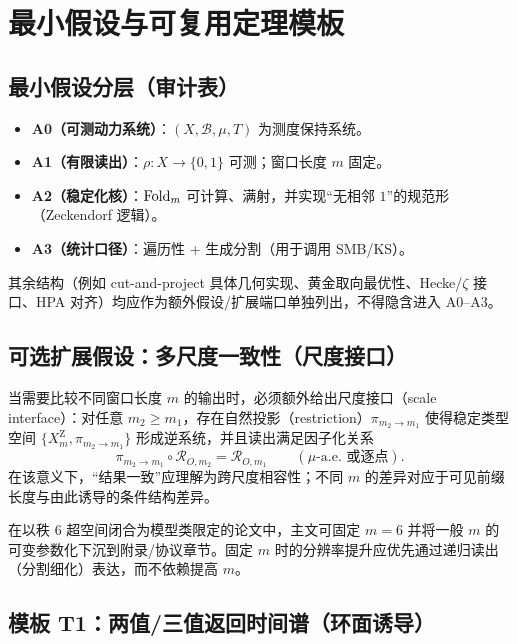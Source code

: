 \section{最小假设与可复用定理模板}

\subsection{最小假设分层（审计表）}

\begin{itemize}
  \item \textbf{A0（可测动力系统）}：$(X,\mathcal{B},\mu,T)$ 为测度保持系统。
  \item \textbf{A1（有限读出）}：$\rho:X\to\{0,1\}$ 可测；窗口长度 $m$ 固定。
  \item \textbf{A2（稳定化核）}：$\mathrm{Fold}_m$ 可计算、满射，并实现“无相邻 $1$”的规范形（Zeckendorf 逻辑）。
  \item \textbf{A3（统计口径）}：遍历性 + 生成分割（用于调用 SMB/KS）。
\end{itemize}

其余结构（例如 cut-and-project 具体几何实现、黄金取向最优性、Hecke/\(\zeta\) 接口、HPA 对齐）均应作为额外假设/扩展端口单独列出，不得隐含进入 A0--A3。

\subsection{可选扩展假设：多尺度一致性（尺度接口）}

\begin{assumption}\label{assump:A4-scale}
当需要比较不同窗口长度 $m$ 的输出时，必须额外给出尺度接口（scale interface）：对任意 $m_2\ge m_1$，存在自然投影（restriction）$\pi_{m_2\to m_1}$ 使得稳定类型空间 $\{X_m^{\mathrm Z},\pi_{m_2\to m_1}\}$ 形成逆系统，并且读出满足因子化关系
\[
\pi_{m_2\to m_1}\circ \mathcal{R}_{O,m_2}=\mathcal{R}_{O,m_1}\qquad (\mu\text{-a.e. 或逐点}).
\]
在该意义下，“结果一致”应理解为跨尺度相容性；不同 $m$ 的差异对应于可见前缀长度与由此诱导的条件结构差异。
\end{assumption}

\begin{remark}[主文固定带宽模板]
在以秩 $6$ 超空间闭合为模型类限定的论文中，主文可固定 $m=6$ 并将一般 $m$ 的可变参数化下沉到附录/协议章节。固定 $m$ 时的分辨率提升应优先通过递归读出（分割细化）表达，而不依赖提高 $m$。
\end{remark}

\subsection{模板 T1：两值/三值返回时间谱（环面诱导）}

